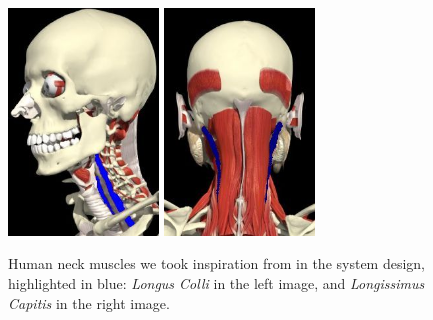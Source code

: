 \documentclass[conference]{IEEEtran}
\numberwithin{equation}{section}
\begin{document}
\begin{figure}[tbp]
\centering
\includegraphics[width=40mm]{image/LongusColliC.jpg} 
\includegraphics[width=40mm]{image/LongissimusCapitisC.jpg} 
\caption{Human neck muscles we took inspiration from in the system design, highlighted in blue: \emph{Longus Colli} in the left image, and \emph{Longissimus Capitis} in the right image.}
\label{Fig:NeckMuscles}
\end{figure}
\end{document}
